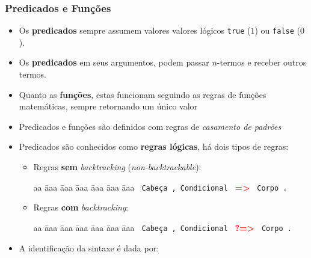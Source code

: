 \begin{frame}[fragile,allowframebreaks=0.8,c]
	\frametitle{Predicados e Funções}
    
\begin{itemize}

\item Os \textbf{predicados} sempre assumem valores valores lógicos \texttt{true} ($1$) ou \texttt{false} ($0$).

\item Os \textbf{predicados} em seus argumentos, podem passar $n$-termos e receber
outros termos.

\item Quanto as \textbf{funções}, estas funcionam seguindo as regras de funções matemáticas,
sempre retornando um único valor

\item Predicados e funções são definidos com regras de \textit{casamento de padrões}


\item Predicados são conhecidos como \textbf{regras lógicas}, há dois tipos de regras:
\framebreak        
        \begin{itemize}
            \item Regras \textbf{sem} {\em backtracking} (\textit{non-backtrackable}):
        	
            \begin{tabbing}
              aa \= aaa \= aaa \= aaa \= aaa \= aaa \= aaa \kill
             \> \> \verb+ Cabeça , Condicional + \textbf{\textcolor{red}{=>}} \verb+ Corpo .+
            \end{tabbing}
            

            \item Regras \textbf{com} {\em backtracking}:
            
            \begin{tabbing}
              aa \= aaa \= aaa \= aaa \= aaa \= aaa \= aaa \kill
             \> \> \verb+ Cabeça , Condicional + \textbf{\textcolor{red}{?=>}} \verb+ Corpo .+
            \end{tabbing}
        
        \end{itemize}
\framebreak        
       
  \item A identificação da sintaxe é dada por:
  
  \begin{itemize}
  

\end{itemize}
\end{itemize}
\end{frame}
